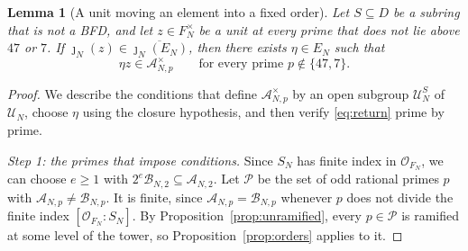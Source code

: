 \documentclass[11pt]{article}
\theoremstyle{plain}
\newtheorem{lemma}[theorem]{Lemma}
\theoremstyle{definition}
\theoremstyle{remark}
\newcommand{\OO}{\mathcal O}
\begin{document}
\begin{lemma}[A unit moving an element into a fixed order]\label{lem:return}
Let $S\subseteq D$ be a subring that is not a BFD, and let
$z\in F_N^\times$ be a unit at every prime that does not lie above $47$ or
$7$.  If $\jmath_N(z)\in\overline{\jmath_N(E_N)}$, then there exists
$\eta\in E_N$ such that
\begin{equation}\label{eq:return}
 \eta z\in\mathcal A_{N,p}^{\times}
       \qquad\text{for every prime }p\notin\{47,7\}.
\end{equation}
\end{lemma}
\begin{proof}
We describe the conditions that define $\mathcal A_{N,p}^\times$ by an
open subgroup $\mathcal U_N^S$ of $\mathcal U_N$, choose $\eta$ using the
closure hypothesis, and then verify \eqref{eq:return} prime by prime.

\emph{Step 1: the primes that impose conditions.}  Since $S_N$ has finite
index in $\OO_{F_N}$, we can choose $e\geq1$ with
$2^e\mathcal B_{N,2}\subseteq\mathcal A_{N,2}$.  Let $\mathcal P$ be the
set of odd rational primes $p$ with $\mathcal A_{N,p}\ne\mathcal B_{N,p}$.
It is finite, since $\mathcal A_{N,p}=\mathcal B_{N,p}$ whenever $p$ does
not divide the finite index $[\OO_{F_N}:S_N]$.  By
Proposition~\ref{prop:unramified}, every $p\in\mathcal P$ is ramified at
some level of the tower, so Proposition~\ref{prop:orders} applies to it.


\end{proof}
\end{document}
